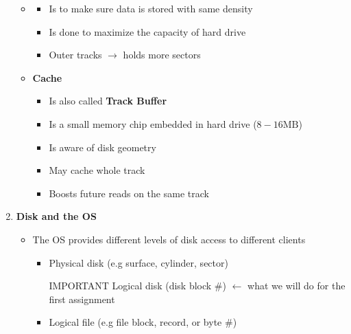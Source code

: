 \documentclass[12pt]{article}
\begin{document}
\begin{enumerate}[1.]
\begin{itemize}
        \item \begin{itemize}
            \item Is to make sure data is stored with same density
            \item Is done to maximize the capacity of hard drive
            \item Outer tracks $\to$ holds more sectors
        \end{itemize}
        \item \textbf{Cache}
        \begin{itemize}
            \item Is also called \textbf{Track Buffer}
            \item Is a small memory chip embedded in hard drive ($8 - 16 \text{MB}$)
            \item Is aware of disk geometry
            \item May cache whole track
            \item Boosts future reads on the same track
        \end{itemize}
    \end{itemize}
    \item \textbf{Disk and the OS}
    \begin{itemize}
        \item The OS provides different levels of disk access to different clients
        \begin{itemize}
            \item Physical disk (e.g surface, cylinder, sector)
            \item [\color{red}IMPORTANT\color{black}] Logical disk (disk block \#) \color{red}$\leftarrow$ what we will do for the first assignment\color{black}
            \item Logical file (e.g file block, record, or byte \#)
        \end{itemize}
    \end{itemize}
\end{enumerate}

\bigskip
\end{document}
